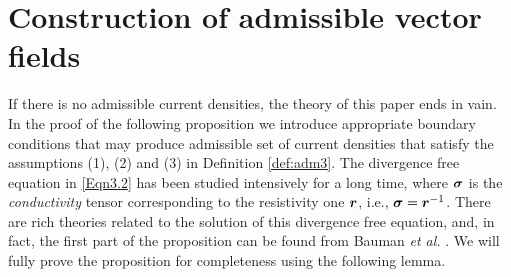 \documentclass[11pt]{amsart}
\theoremstyle{plain}
\theoremstyle{remark}
\numberwithin{equation}{section}
\numberwithin{Thm}{section}
\def\r{{\bf r}}
\def\Sigma{\mbox{\boldmath$\sigma$}}
\def\r{\mbox{\boldmath$r$}}
\begin{document}
\appendix

\section{Construction of admissible vector fields}\label{sect.cons}

If there is no admissible current densities, the theory of this paper ends in vain. In the proof of the following proposition we introduce appropriate boundary conditions that may produce admissible set of current densities that satisfy the assumptions (1), (2) and (3) in Definition \ref{def:adm3}. The divergence free equation in \eqref{Eqn3.2} has been studied intensively for a long time, where $\Sigma$ is the \emph{conductivity} tensor corresponding to the resistivity one $\r$, i.e., $\Sigma=\r^{-1}$. There are rich theories related to the solution of this divergence free equation, and, in fact, the first part of the proposition can be found from Bauman \emph{et al.} \cite{MR1871388}. We will fully prove the proposition for completeness using the following lemma.
\end{document}
